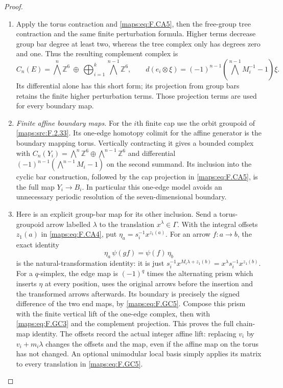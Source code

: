 \begin{proof}
\begin{enumerate}[label=\arabic*.]
\item Apply the torus contraction and \eqref{maps:eq:F.CA5}, then the free-group
tree contraction and the same finite perturbation formula.
Higher terms decrease group bar degree at least two, whereas
the tree complex only has degrees zero and one.  Thus the
resulting complement complex is
\[
 C_n(E)=\bigwedge^n\mathbb Z^6\ \oplus\
 \bigoplus_{i=1}^k\bigwedge^{n-1}\mathbb Z^6,
 \qquad
 d(e_i\otimes\xi)=(-1)^{n-1}
   (\bigwedge^{n-1}M_i^{-1}-1)\xi.                         \tag{F.GC4}\label{maps:eq:F.GC4}
\]
Its differential alone has this short form; its projection
from group bars retains the finite higher perturbation terms.
Those projection terms are used for every boundary map.

\item \emph{Finite affine boundary maps.}
For the $i$th finite cap use the orbit groupoid of \ref{maps:src:F.2.33}.
Its one-edge homotopy colimit for the affine generator is
the boundary mapping torus.  Vertically contracting it gives
a bounded complex with
$C_n(Y_i)=\bigwedge^n\mathbb Z^6\oplus
\bigwedge^{n-1}\mathbb Z^6$ and differential
$(-1)^{n-1}(\bigwedge^{n-1}M_i-1)$ on the second summand.
Its inclusion into the cyclic bar construction, followed by
the cap projection in \eqref{maps:eq:F.CA5}, is the full map $Y_i\to B_i$.
In particular this one-edge model avoids an unnecessary
periodic resolution of the seven-dimensional boundary.

\item Here is an explicit group-bar map for its other inclusion.
Send a torus-groupoid arrow labelled $\lambda$ to the
translation $x^\lambda\in\Gamma$.  With the integral offsets
$z_1(a)$ in \eqref{maps:eq:F.CA4}, put
$\eta_a=s_i^{-1}x^{z_1(a)}$.
For an arrow $f:a\to b$, the exact identity
\[
 \eta_a\,\psi(gf)=\psi(f)\,\eta_b                        \tag{F.GC5}\label{maps:eq:F.GC5}
\]
is the natural-transformation identity: it is just
$s_i^{-1}x^{M_i\lambda+z_1(b)}
 =x^\lambda s_i^{-1}x^{z_1(b)}$.
For a $q$-simplex, the edge map is $(-1)^q$ times the
alternating prism which inserts $\eta$ at every position,
uses the original arrows before the insertion and the
transformed arrows afterwards.  Its boundary is precisely
the signed difference of the two end maps, by \eqref{maps:eq:F.GC5}.
Compose this prism with the finite vertical lift of the
one-edge complex, then with \eqref{maps:eq:F.GC3} and the complement
projection.  This proves the full chain-map identity.
The offsets record the actual integer affine lift: replacing
$v_i$ by $v_i+m_i\lambda$ changes the offsets and the map,
even if the affine map on the torus has not changed.
An optional unimodular local basis simply applies its matrix
to every translation in \eqref{maps:eq:F.GC5}.


\end{enumerate}
\end{proof}
